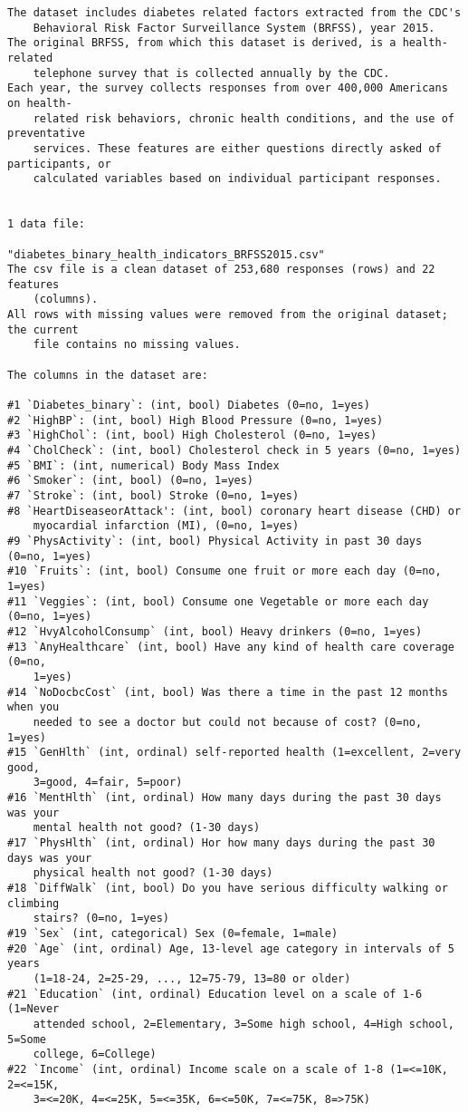 \documentclass[11pt]{article}
\begin{document}
\begin{Verbatim}[tabsize=4]
The dataset includes diabetes related factors extracted from the CDC's
	Behavioral Risk Factor Surveillance System (BRFSS), year 2015.
The original BRFSS, from which this dataset is derived, is a health-related
	telephone survey that is collected annually by the CDC.
Each year, the survey collects responses from over 400,000 Americans on health-
	related risk behaviors, chronic health conditions, and the use of preventative
	services. These features are either questions directly asked of participants, or
	calculated variables based on individual participant responses.


1 data file:

"diabetes_binary_health_indicators_BRFSS2015.csv"
The csv file is a clean dataset of 253,680 responses (rows) and 22 features
	(columns).
All rows with missing values were removed from the original dataset; the current
	file contains no missing values.

The columns in the dataset are:

#1 `Diabetes_binary`: (int, bool) Diabetes (0=no, 1=yes)
#2 `HighBP`: (int, bool) High Blood Pressure (0=no, 1=yes)
#3 `HighChol`: (int, bool) High Cholesterol (0=no, 1=yes)
#4 `CholCheck`: (int, bool) Cholesterol check in 5 years (0=no, 1=yes)
#5 `BMI`: (int, numerical) Body Mass Index
#6 `Smoker`: (int, bool) (0=no, 1=yes)
#7 `Stroke`: (int, bool) Stroke (0=no, 1=yes)
#8 `HeartDiseaseorAttack': (int, bool) coronary heart disease (CHD) or
	myocardial infarction (MI), (0=no, 1=yes)
#9 `PhysActivity`: (int, bool) Physical Activity in past 30 days (0=no, 1=yes)
#10 `Fruits`: (int, bool) Consume one fruit or more each day (0=no, 1=yes)
#11 `Veggies`: (int, bool) Consume one Vegetable or more each day (0=no, 1=yes)
#12 `HvyAlcoholConsump` (int, bool) Heavy drinkers (0=no, 1=yes)
#13 `AnyHealthcare` (int, bool) Have any kind of health care coverage (0=no,
	1=yes)
#14 `NoDocbcCost` (int, bool) Was there a time in the past 12 months when you
	needed to see a doctor but could not because of cost? (0=no, 1=yes)
#15 `GenHlth` (int, ordinal) self-reported health (1=excellent, 2=very good,
	3=good, 4=fair, 5=poor)
#16 `MentHlth` (int, ordinal) How many days during the past 30 days was your
	mental health not good? (1-30 days)
#17 `PhysHlth` (int, ordinal) Hor how many days during the past 30 days was your
	physical health not good? (1-30 days)
#18 `DiffWalk` (int, bool) Do you have serious difficulty walking or climbing
	stairs? (0=no, 1=yes)
#19 `Sex` (int, categorical) Sex (0=female, 1=male)
#20 `Age` (int, ordinal) Age, 13-level age category in intervals of 5 years
	(1=18-24, 2=25-29, ..., 12=75-79, 13=80 or older)
#21 `Education` (int, ordinal) Education level on a scale of 1-6 (1=Never
	attended school, 2=Elementary, 3=Some high school, 4=High school, 5=Some
	college, 6=College)
#22 `Income` (int, ordinal) Income scale on a scale of 1-8 (1=<=10K, 2=<=15K,
	3=<=20K, 4=<=25K, 5=<=35K, 6=<=50K, 7=<=75K, 8=>75K)


\end{Verbatim}
\end{document}
